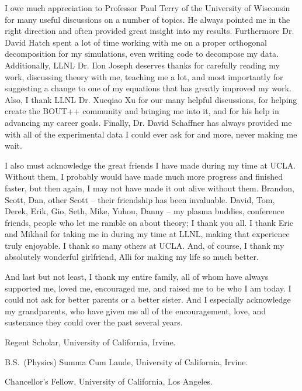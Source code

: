 {I owe much appreciation to Professor Paul Terry of the University of Wisconsin for many useful discussions on a number of topics. He always pointed me in the right direction and often provided
great insight into my results. Furthermore Dr. David Hatch spent a lot of time working with me on a proper orthogonal decomposition for my simulations, even writing code to decompose my data.
Additionally, LLNL Dr. Ilon Joseph deserves thanks for carefully reading my work, discussing theory with me, teaching me a lot,
and most importantly for suggesting a change to one of my equations that has greatly improved my work. Also, I thank LLNL Dr. Xueqiao Xu for our many helpful discussions, for helping create the
BOUT++ community and bringing me into it, and for his help in advancing my career goals. Finally, Dr. David Schaffner has always provided me with all of the experimental data I could ever ask for and
more, never making me wait.

I also must acknowledge the great friends I have made during my time at UCLA. Without them, I probably would have made much more progress and finished faster, but then again, I may not have made it
out alive without them. Brandon, Scott, Dan, other Scott -- their friendship has been invaluable. David, Tom, Derek, Erik, Gio, Seth, Mike, Yuhou, Danny -- my plasma buddies, conference friends, people
who let me ramble on about theory; I thank you all. I thank Eric and Mikhail for taking me in during my time at LLNL, making that experience truly enjoyable. I thank so many others at UCLA.
And, of course, I thank my absolutely wonderful girlfriend, Alli for making my life so much better.

And last but not least, I thank my entire family, all of whom have always supported me, loved me, encouraged me, and raised me to be who I am today. I could not ask for better parents or a better
sister. And I especially acknowledge my grandparents, who have given me all of the encouragement, love, and sustenance they could over the past several years.}



                {Regent Scholar, University of California, Irvine.}

                {B.S.~(Physics) Summa Cum Laude, University of California, Irvine.}

                {Chancellor's Fellow, University of California, Los Angeles.}

